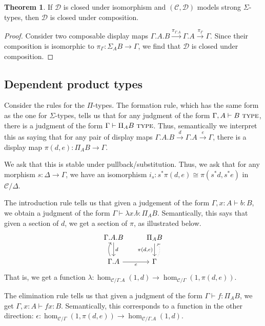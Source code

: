 \documentclass{article}
\theoremstyle{definition}
\newtheorem{theorem}[definition]{Theorem}
\newcommand{\type}{\ \textsc{type}}
\newcommand{\C}{\mathcal C}
\newcommand{\D}{\mathcal D}
\begin{document}
\begin{theorem}
    If $\D$ is closed under isomorphism and $(\C, \D)$ models strong $\Sigma$-types, then $\D$ is closed under composition.
\end{theorem}
\begin{proof}
    Consider two composable display maps $\Gamma.A . B \xrightarrow{\pi_{\Gamma.A}} \Gamma. A  \xrightarrow{\pi_{\Gamma}} \Gamma$. Since their composition is isomorphic to $\pi_\Gamma : \Sigma_A B \to \Gamma$, we find that $\D$ is closed under composition.
\end{proof}

\subsection{Dependent product types}

Consider the rules for the $\Pi$-types. The formation rule, which has the same form as the one for $\Sigma$-types, tells us that for any judgment of the form $\Gamma, A \vdash B \type$, there is a judgment of the form $\Gamma \vdash \Pi_A B \type$. Thus, semantically we interpret this as saying that for any pair of display maps $\Gamma.A . B \xrightarrow{d} \Gamma. A  \xrightarrow{e} \Gamma$, there is a display map $\pi(d,e) : \Pi_A B \to \Gamma$.

We ask that this is stable under pullback/substitution. Thus, we ask that for any morphism $s : \Delta \to \Gamma$, we have an isomorphism $i_s: s^* \pi(d,e) \cong \pi(s^*d, s^*e)$ in $\C / \Delta$.

The introduction rule tells us that given a judgement of the form $\Gamma, x: A \vdash b : B$, we obtain a judgment of the form $\Gamma \vdash \lambda x . b: \Pi_A B $. Semantically, this says that given a section of $d$, we get a section of $\pi$, as illustrated below.
\[
     \begin{tikzcd}
         \Gamma.A.B \ar[d,"d"] & \Pi_A B \ar[d,"{\pi(d,e)}"']
         \\ 
         \Gamma.A \ar[r,"e"'] \ar[u,bend left]& \Gamma \ar[u, bend right, dotted]
     \end{tikzcd}
\]
That is, we get a function $\lambda : \hom_{\C / \Gamma . A} (1, d) \to \hom_{\C / \Gamma} (1 , {\pi(d,e)})$.

The elimination rule tells us that given a judgment of the form $\Gamma \vdash f : \Pi_A B$, we get $\Gamma, x : A \vdash f x : B $. Semantically, this corresponds to a function in the other direction: $\epsilon : \hom_{\C / \Gamma} (1 , {\pi(d,e)}) \to \hom_{\C / \Gamma . A} (1, d)$.
\end{document}
